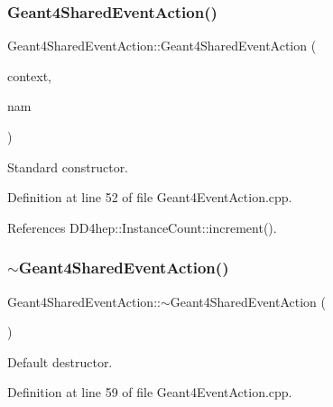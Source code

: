 \subsubsection{\texorpdfstring{Geant4\+Shared\+Event\+Action()}{Geant4SharedEventAction()}}
{\footnotesize\ttfamily Geant4\+Shared\+Event\+Action\+::\+Geant4\+Shared\+Event\+Action (\begin{DoxyParamCaption}\item[{\hyperlink{class_d_d4hep_1_1_simulation_1_1_geant4_context}{Geant4\+Context} $\ast$}]{context,  }\item[{const std\+::string \&}]{nam }\end{DoxyParamCaption})}



Standard constructor. 



Definition at line 52 of file Geant4\+Event\+Action.\+cpp.



References D\+D4hep\+::\+Instance\+Count\+::increment().

\hypertarget{class_d_d4hep_1_1_simulation_1_1_geant4_shared_event_action_a094e353ce282d06dac18c5752c078c63}{}\label{class_d_d4hep_1_1_simulation_1_1_geant4_shared_event_action_a094e353ce282d06dac18c5752c078c63} 
\subsubsection{\texorpdfstring{$\sim$\+Geant4\+Shared\+Event\+Action()}{~Geant4SharedEventAction()}}
{\footnotesize\ttfamily Geant4\+Shared\+Event\+Action\+::$\sim$\+Geant4\+Shared\+Event\+Action (\begin{DoxyParamCaption}{ }\end{DoxyParamCaption})\hspace{0.3cm}{\ttfamily [virtual]}}



Default destructor. 



Definition at line 59 of file Geant4\+Event\+Action.\+cpp.



